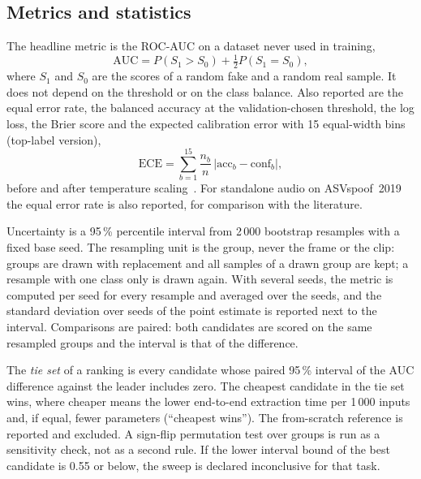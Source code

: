 \documentclass[conference,a4paper]{IEEEtran_nodash}
\begin{document}
\subsection{Metrics and statistics}\label{sec:stats}
The headline metric is the ROC-AUC on a dataset never used in training,
\begin{equation}
\mathrm{AUC}=P(S_1>S_0)+\tfrac12 P(S_1=S_0),
\end{equation}
where $S_1$ and $S_0$ are the scores of a random fake and a random real
sample. It does not depend on the threshold or on the class balance. Also
reported are the equal error rate, the balanced accuracy at the
validation-chosen threshold, the log loss, the Brier score and the expected
calibration error with 15 equal-width bins (top-label version),
\begin{equation}
\mathrm{ECE}=\sum_{b=1}^{15}\frac{n_b}{n}\,\bigl|\mathrm{acc}_b-\mathrm{conf}_b\bigr|,
\end{equation}
before and after temperature scaling~\cite{guo2017calibration}. For standalone
audio on ASVspoof~2019 the equal error rate is also reported, for comparison
with the literature.

Uncertainty is a 95\,\% percentile interval from 2\,000 bootstrap resamples
with a fixed base seed. The resampling unit is the group, never the frame or the
clip: groups are drawn with replacement and all samples of a drawn group are
kept; a resample with one class only is drawn again. With several seeds, the
metric is computed per seed for every resample and averaged over the seeds, and
the standard deviation over seeds of the point estimate is reported next to the
interval. Comparisons are paired: both candidates are scored on the same
resampled groups and the interval is that of the difference.

The \emph{tie set} of a ranking is every candidate whose paired 95\,\%
interval of the AUC difference against the leader includes zero. The cheapest
candidate in the tie set wins, where cheaper means the lower end-to-end
extraction time per 1\,000 inputs and, if equal, fewer parameters (``cheapest
wins''). The from-scratch reference is reported and excluded. A sign-flip
permutation test over groups is run as a sensitivity check, not as a second
rule. If the lower interval bound of the best candidate is 0.55 or below, the
sweep is declared inconclusive for that task.
\end{document}
